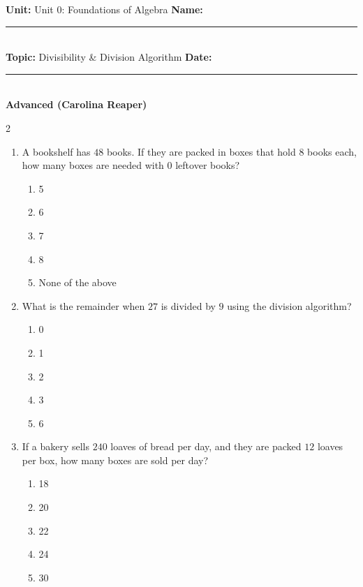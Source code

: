 \documentclass[10pt]{article}
\begin{document}
\enlargethispage{2.5cm}

\begin{tcolorbox}[colback=mainblue!5, colframe=mainblue, sharp corners, boxrule=0.5pt]
    \small \textbf{Unit:} Unit 0: Foundations of Algebra \hfill \textbf{Name:} \rule{3cm}{0.4pt} \\
    \small \textbf{Topic:} Divisibility & Division Algorithm \hfill \textbf{Date:} \rule{2cm}{0.4pt} \\
    \centering \textbf{\large Advanced (Carolina Reaper)}
\end{tcolorbox}

\vspace{0.2cm}

\begin{multicols}{2}
\begin{enumerate}[label=\textbf{Q\arabic*.}, leftmargin=*, itemsep=6pt, parsep=0pt]

  \item \small A bookshelf has $48$ books. If they are packed in boxes that hold $8$ books each, how many boxes are needed with $0$ leftover books?
  \begin{enumerate}[label=(\Alph*), leftmargin=0.6cm, nosep, itemsep=2pt]
    \item 5
    \item 6
    \item 7
    \item 8
    \item None of the above
  \end{enumerate}

  \item \small What is the remainder when $27$ is divided by $9$ using the division algorithm?
  \begin{enumerate}[label=(\Alph*), leftmargin=0.6cm, nosep, itemsep=2pt]
    \item 0
    \item 1
    \item 2
    \item 3
    \item 6
  \end{enumerate}

  \item \small If a bakery sells $240$ loaves of bread per day, and they are packed $12$ loaves per box, how many boxes are sold per day?
  \begin{enumerate}[label=(\Alph*), leftmargin=0.6cm, nosep, itemsep=2pt]
    \item 18
    \item 20
    \item 22
    \item 24
    \item 30
  \end{enumerate}


\end{enumerate}
\end{multicols}
\end{document}
